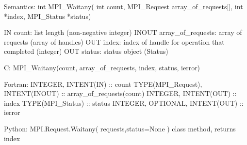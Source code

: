 Semantics:
int MPI_Waitany(
    int count, MPI_Request array_of_requests[], int *index,
    MPI_Status *status)

IN count: list length (non-negative integer)
INOUT array_of_requests: array of requests (array of handles)
OUT index: index of handle for operation that completed (integer)
OUT status: status object (Status)

C:
MPI_Waitany(count, array_of_requests, index, status, ierror)

Fortran:
INTEGER, INTENT(IN) :: count
TYPE(MPI_Request), INTENT(INOUT) :: array_of_requests(count)
INTEGER, INTENT(OUT) :: index
TYPE(MPI_Status) :: status
INTEGER, OPTIONAL, INTENT(OUT) :: ierror

Python:
MPI.Request.Waitany( requests,status=None )
class method, returns index
